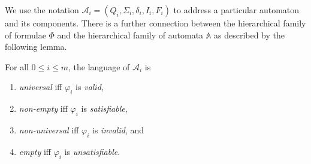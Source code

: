  We use the notation $\mathcal{A}_i = (Q_i, \Sigma_i, \delta_i, I_i, F_i)$ to
 address a particular automaton and its components.
There is a further connection between the hierarchical family of formulae $\Phi$
and the hierarchical family of automata $\mathbb{A}$ as described by the
following lemma.
 \begin{lemma}\label{uni-valid} For all $0 \leq i \leq m$, the language of
$\mathcal{A}_i$ is
\begin{enumerate}
  \item \emph{universal} iff $\varphi_i$ is \emph{valid},
  \item \emph{non-empty} iff $\varphi_i$ is \emph{satisfiable},
  \item \emph{non-universal} iff $\varphi_i$ is \emph{invalid}, and
  \item \emph{empty} iff $\varphi_i$ is \emph{unsatisfiable}.
\end{enumerate}
\end{lemma}


